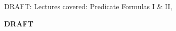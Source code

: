 \documentclass[handout]{mcs}
\begin{document}
\renewcommand{\reading}{
\begin{itemize}
\item Chapter~\bref{logicform_chap}{.\ \emph{Logical Formulas}}
\bref{prop_algebra_sec} through~\bref{predicate_sec} %
\item TBA
\end{itemize}}


\begin{staffnotes}
DRAFT: Lectures covered: Predicate Formulas I \& II,
\end{staffnotes}



\begin{center}
\textbf{DRAFT}
\end{center}


\end{document}
